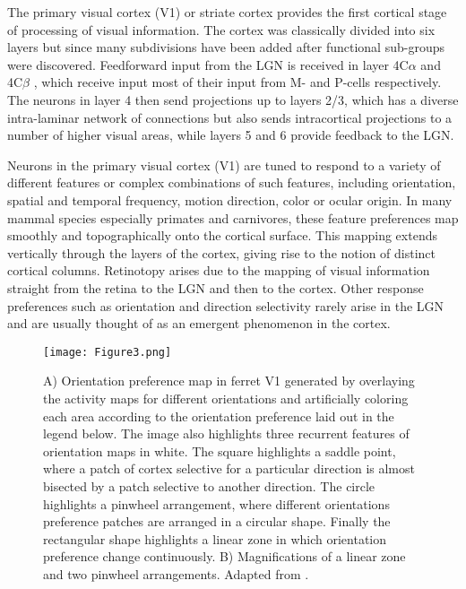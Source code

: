 The primary visual cortex (V1) or striate cortex provides the first
cortical stage of processing of visual information. The cortex was
classically divided into six layers but since many subdivisions have
been added after functional sub-groups were discovered. Feedforward
input from the LGN is received in layer 4C$\alpha$ and 4C$\beta$ ,
which receive input most of their input from M- and P-cells
respectively. The neurons in layer 4 then send projections up to
layers 2/3, which has a diverse intra-laminar network of connections
but also sends intracortical projections to a number of higher visual
areas, while layers 5 and 6 provide feedback to the LGN.

Neurons in the primary visual cortex (V1) are tuned to respond to a
variety of different features or complex combinations of such
features, including orientation, spatial and temporal frequency,
motion direction, color or ocular origin. In many mammal species
especially primates and carnivores, these feature preferences map
smoothly and topographically onto the cortical surface. This mapping
extends vertically through the layers of the cortex, giving rise to
the notion of distinct cortical columns. Retinotopy arises due to the
mapping of visual information straight from the retina to the LGN and
then to the cortex. Other response preferences such as orientation and
direction selectivity rarely arise in the LGN and are usually thought
of as an emergent phenomenon in the cortex.

\begin{figure}
	\centering \texttt{[image: Figure3.png]}
	\caption[A ferret orientation map in primary visual
      cortex. Adapted from \cite{Bosking1997}.]{A) Orientation
      preference map in ferret V1 generated by overlaying the activity
      maps for different orientations and artificially coloring each
      area according to the orientation preference laid out in the
      legend below. The image also highlights three recurrent features
      of orientation maps in white. The square highlights a saddle
      point, where a patch of cortex selective for a particular
      direction is almost bisected by a patch selective to another
      direction. The circle highlights a pinwheel arrangement, where
      different orientations preference patches are arranged in a
      circular shape. Finally the rectangular shape highlights a
      linear zone in which orientation preference change
      continuously. B) Magnifications of a linear zone and two
      pinwheel arrangements. Adapted from \cite{Bosking1997}.}
	\label{OrientationMap}
\end{figure}

